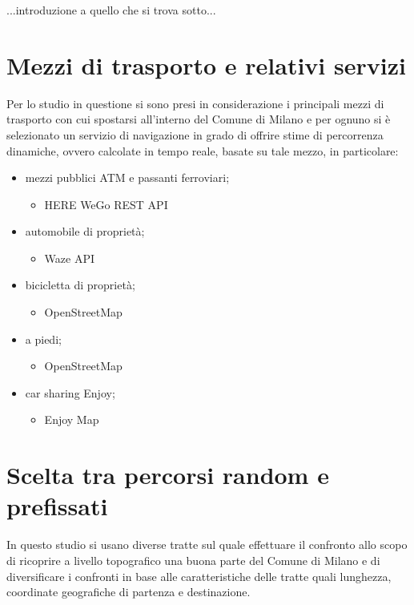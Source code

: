 ...introduzione a quello che si trova sotto...

\section{Mezzi di trasporto e relativi servizi}

Per lo studio in questione si sono presi in considerazione i principali mezzi di trasporto con cui spostarsi all'interno del Comune di Milano e per ognuno si è selezionato un servizio di navigazione in grado di offrire stime di percorrenza dinamiche, ovvero calcolate in tempo reale, basate su tale mezzo, in particolare:

\begin{itemize}
	\item mezzi pubblici ATM e passanti ferroviari;
	\begin{itemize}
		\item HERE WeGo REST API\cite{herewegoapi}
	\end{itemize}
	\item automobile di proprietà;
	\begin{itemize}
		\item Waze API\cite{wazeapi}
	\end{itemize}
	\item bicicletta di proprietà;
	\begin{itemize}
		\item OpenStreetMap\cite{openstreetmap}
	\end{itemize}
	\item a piedi;
	\begin{itemize}
		\item OpenStreetMap\cite{openstreetmap}
	\end{itemize}
	\item car sharing Enjoy;
	\begin{itemize}
		\item Enjoy Map\cite{enjoycarsharing}
	\end{itemize}
\end{itemize}



\section{Scelta tra percorsi random e prefissati}

In questo studio si usano diverse tratte sul quale effettuare il confronto allo scopo di ricoprire a livello topografico una buona parte del Comune di Milano e di diversificare i confronti in base alle caratteristiche delle tratte quali lunghezza, coordinate geografiche di partenza e destinazione.


